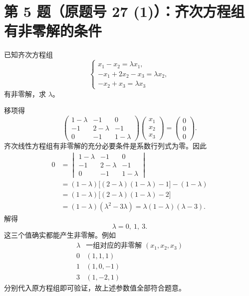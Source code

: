 \documentclass[11pt,a4paper,fontset=fandol]{ctexart}
\newcommand{\ans}[1]{\boxed{#1}}
\begin{document}
\newpage
\section*{第 5 题（原题号 27 (1)）：齐次方程组有非零解的条件}
已知齐次方程组
\[
\begin{cases}
x_1-x_2=\lambda x_1,\\
-x_1+2x_2-x_3=\lambda x_2,\\
-x_2+x_3=\lambda x_3
\end{cases}
\]
有非零解，求 $\lambda$。

移项得
\[
\begin{pmatrix}
1-\lambda&-1&0\\
-1&2-\lambda&-1\\
0&-1&1-\lambda
\end{pmatrix}
\begin{pmatrix}x_1\\x_2\\x_3\end{pmatrix}
=\begin{pmatrix}0\\0\\0\end{pmatrix}.
\]
齐次线性方程组有非零解的充分必要条件是系数行列式为零。因此
\begin{align*}
0&=\begin{vmatrix}
1-\lambda&-1&0\\
-1&2-\lambda&-1\\
0&-1&1-\lambda
\end{vmatrix}\\
&=(1-\lambda)\bigl[(2-\lambda)(1-\lambda)-1\bigr]-(1-\lambda)\\
&=(1-\lambda)\bigl[(2-\lambda)(1-\lambda)-2\bigr]\\
&=(1-\lambda)(\lambda^2-3\lambda)
=\lambda(1-\lambda)(\lambda-3).
\end{align*}
解得
\[
\ans{\lambda=0,\ 1,\ 3}.
\]
这三个值确实都能产生非零解。例如
\[
\begin{array}{c|c}
\lambda&\text{一组对应的非零解 }(x_1,x_2,x_3)\\\hline
0&(1,1,1)\\
1&(1,0,-1)\\
3&(1,-2,1)
\end{array}
\]
分别代入原方程组即可验证，故上述参数值全部符合题意。
\end{document}

